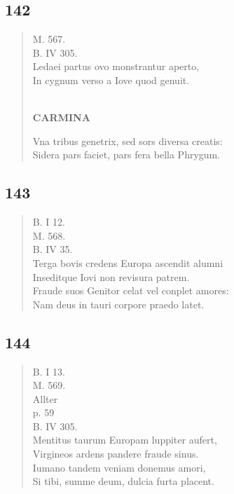 \documentclass[11pt, a4paper]{report}
\begin{document}
            \subsection*{142}
      \begin{verse}
      M. 567. \\ B. IV 305. \\ Ledaei partus ovo monstrantur aperto, \\ In cygnum verso a Iove quod genuit. \\ 
        ﻿\pagebreak 
     \marginpar{[142]} \begin{center} \textbf{CARMINA} \end{center}Vna tribus genetrix, sed sors diversa creatis: \\ Sidera pars faciet, pars fera bella Phrygum. \\ 
      \end{verse}
  
            \subsection*{143}
      \begin{verse}
      B. I 12. \\ M. 568. \\ B. IV 35. \\ Terga bovis credens Europa ascendit alumni \\ Inseditque Iovi non revisura patrem. \\ Fraude suos Genitor celat vel conplet amores: \\ Nam deus in tauri corpore praedo latet. \\ 
      \end{verse}
  
            \subsection*{144}
      \begin{verse}
      B. I 13. \\ M. 569. \\ Allter \\ p. 59 \\ B. IV 305. \\ Mentitus taurum Europam luppiter aufert, \\ Virgineos ardens pandere fraude sinus. \\ Iumano tandem veniam donemus amori, \\ Si tibi, summe deum, dulcia furta placent. \\ 
      \end{verse}
  
\end{document}
